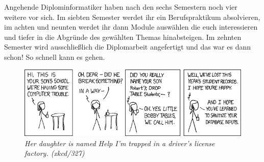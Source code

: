 \hline

Angehende Diplominformatiker haben nach den sechs Semestern noch vier weitere vor sich.
Im siebten Semester werdet ihr ein Berufspraktikum absolvieren, im achten und neunten werdet ihr dann Module auswählen die euch interessieren und tiefer in die Abgründe des gewählten Themas hinabsteigen.
Im zehnten Semester wird ausschließlich die Diplomarbeit angefertigt und das war es dann schon!
So schnell kann es gehen.

\begin{figure}[h!]
\centering \includegraphics[width=\linewidth]{img/xkcd/exploits_of_a_mom.png}
\caption*{{\small \textit{Her daughter is named Help I'm trapped in a driver's license factory. (xkcd/327)}}}
\end{figure}
